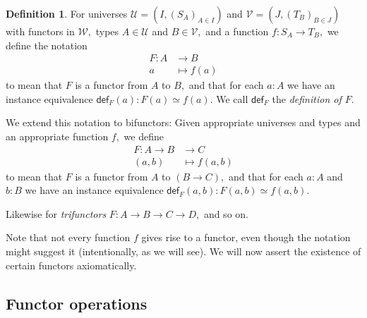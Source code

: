 \documentclass[a4paper]{article}
\theoremstyle{definition}
\newtheorem{definition}{Definition}[section]
\theoremstyle{remark}
\newcommand{\defn}{\emph}
\renewcommand{\equiv}{\simeq}
\newcommand{\U}{\mathcal{U}}
\newcommand{\V}{\mathcal{V}}
\newcommand{\W}{\mathcal{W}}
\newcommand{\nm}{\mathsf}
\newcommand{\fndef}[1]{\nm{def}_{#1}}
\begin{document}
\begin{definition}
  For universes $\U = (I, (S_A)_{A \in I})$ and $\V = (J, (T_B)_{B \in J})$ with functors in
  $\W,$ types $A \in \U$ and $B \in \V,$ and a function $f : S_A \to T_B,$ we define the
  notation
  \begin{align*}
    F : A &\to     B\\
        a &\mapsto f(a)
  \end{align*}
  to mean that $F$ is a functor from $A$ to $B,$ and that for each $a : A$ we have an instance
  equivalence $\fndef{F}(a) : F(a) \equiv f(a).$ We call $\fndef{F}$ the
  \defn{definition of $F$}.

  We extend this notation to bifunctors: Given appropriate universes and types and an
  appropriate function $f,$ we define
  \begin{align*}
    F : A \to B &\to     C\\
        (a,b)   &\mapsto f(a,b)
  \end{align*}
  to mean that $F$ is a functor from $A$ to $(B \to C),$ and that for each $a : A$ and $b : B$ we
  have an instance equivalence $\fndef{F}(a,b) : F(a,b) \equiv f(a,b).$

  Likewise for \defn{trifunctors} $F : A \to B \to C \to D,$ and so on.
\end{definition}

Note that not every function $f$ gives rise to a functor, even though the notation might suggest
it (intentionally, as we will see). We will now assert the existence of certain functors
axiomatically.

\subsection{Functor operations}
\label{sec:funop}
\end{document}
